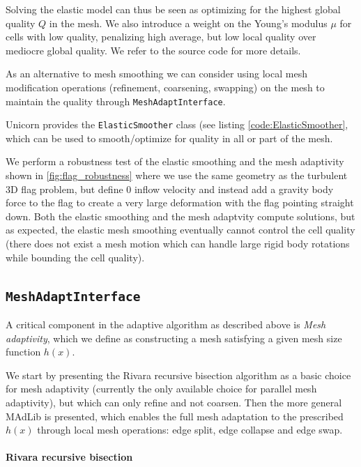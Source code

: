 Solving the elastic model can thus be seen as optimizing for the
highest global quality $Q$ in the mesh. We also introduce a weight on
the Young's modulus $\mu$ for cells with low quality, penalizing high
average, but low local quality over mediocre global quality. We refer
to the source code for more details.

As an alternative to mesh smoothing we can consider using local mesh
modification operations (refinement, coarsening, swapping) on the mesh
to maintain the quality \citep{Comp`ereRemacleJanssonEtAl2009}
through {\tt MeshAdaptInterface}.

Unicorn provides the {\tt ElasticSmoother} class (see
listing \ref{code:ElasticSmoother}, which can be used to
smooth/optimize for quality in all or part of the mesh.

We perform a robustness test of the elastic smoothing and the mesh
adaptivity shown in \ref{fig:flag_robustness} where we use the same
geometry as the turbulent 3D flag problem, but define 0 inflow
velocity and instead add a gravity body force to the flag to create a
very large deformation with the flag pointing straight down. Both the
elastic smoothing and the mesh adaptvity compute solutions, but as
expected, the elastic mesh smoothing eventually cannot control the
cell quality (there does not exist a mesh motion which can handle
large rigid body rotations while bounding the cell quality).

\subsection{\tt MeshAdaptInterface}

A critical component in the adaptive algorithm as described above is
{\em Mesh adaptivity}, which we define as constructing a mesh
satisfying a given mesh size function $h(x)$.

We start by presenting the Rivara recursive bisection
algorithm \citep{Rivara1992} as a basic choice for mesh adaptivity
(currently the only available choice for parallel mesh adaptivity),
but which can only refine and not coarsen. Then the more general
MAdLib is presented, which enables the full mesh adaptation to the
prescribed $h(x)$ through local mesh operations: edge split, edge
collapse and edge swap.

\paragraph{Rivara recursive bisection}

